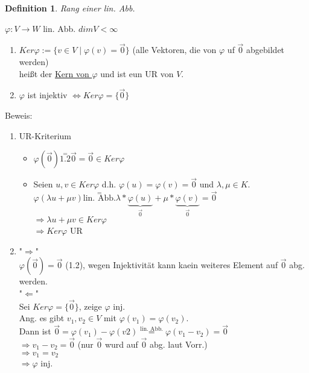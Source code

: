 \documentclass[a4paper,11pt]{article}
\newtheorem{definition}{Definition}[section]
\newcommand{\zerovec}{\overset{\rightarrow}{0}}
\begin{document}
\begin{definition}
Rang einer lin. Abb.
\end{definition}
$\varphi\colon V\rightarrow W$ lin. Abb. $dimV<\infty$
\begin{enumerate}[label=\alph*)]
	\item $Ker\varphi :=\{v\in V\mid \varphi(v)=\zerovec\}$ (alle Vektoren, die von $\varphi$ uf $\zerovec$ abgebildet werden) \\ heißt der \underline{Kern von $\varphi$} und ist eun UR von $V$.
	\item $\varphi$ ist injektiv $\Leftrightarrow Ker\varphi=\{\zerovec\}$
\end{enumerate}
Beweis: \\
\vspace{-5mm}
\begin{enumerate}[label=\alph*)]
	\item UR-Kriterium
	\begin{itemize}
		\item $\varphi(\zerovec)\overset{=}{1.2}\zerovec=\zerovec\in Ker\varphi$
		\item Seien $u,v\in Ker\varphi$ d.h. $\varphi(u)=\varphi(v)=\zerovec$ und $\lambda,\mu\in K.$ \\ $\varphi(\lambda u+\mu v)\overset{=}{\text{lin. Abb.}}\lambda*\underbrace{\varphi(u)}_{\zerovec}+\mu*\underbrace{\varphi(v)}_{\zerovec}=\zerovec$ \\ $\Rightarrow\lambda u+\mu v\in Ker\varphi$ \\ $\Rightarrow Ker\varphi$ UR
	\end{itemize}
	\item "$\Rightarrow$" \\ $\varphi(\zerovec)=\zerovec$ (1.2), wegen Injektivität kann kaein weiteres Element auf $\zerovec$ abg. werden. \\ "$\Leftarrow$" \\
	Sei $Ker\varphi=\{\zerovec\}$, zeige $\varphi$ inj. \\ Ang. es gibt $v_1,v_2\in V$ mit $\varphi(v_1)=\varphi(v_2)$. \\ 
	Dann ist $\zerovec=\varphi(v_1)-\varphi(v2)\overset{\text{lin. Abb.}}{=}\varphi(v_1-v_2)=\zerovec$ \\
	$\Rightarrow v_1-v_2=\zerovec$ (nur $\zerovec$ wurd auf $\zerovec$ abg. laut Vorr.) \\
	$\Rightarrow v_1=v_2$ \\
	$\Rightarrow\varphi$ inj.
\end{enumerate}
\end{document}
